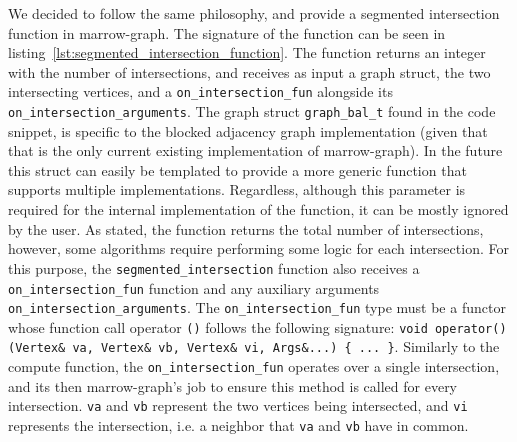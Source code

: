 We decided to follow the same philosophy, and provide a segmented intersection function in marrow-graph. The signature of the function can be seen in listing~\ref{lst:segmented_intersection_function}. The function returns an integer with the number of intersections, and receives as input a graph struct, the two intersecting vertices, and a \texttt{on\_intersection\_fun} alongside its \texttt{on\_intersection\_arguments}. The graph struct \texttt{graph\_bal\_t} found in the code snippet, is specific to the blocked adjacency graph implementation (given that that is the only current existing implementation of marrow-graph). In the future this struct can easily be templated to provide a more generic function that supports multiple implementations. Regardless, although this parameter is required for the internal implementation of the function, it can be mostly ignored by the user. As stated, the function returns the total number of intersections, however, some algorithms require performing some logic for each intersection. For this purpose, the \texttt{segmented\_intersection} function also receives a \texttt{on\_intersection\_fun} function and any auxiliary arguments \texttt{on\_intersection\_arguments}. The \texttt{on\_intersection\_fun} type must be a functor whose function call operator \texttt{()} follows the following signature: \texttt{void operator()(Vertex\& va, Vertex\& vb, Vertex\& vi, Args\&...) \{ ... \}}. Similarly to the compute function, the \texttt{on\_intersection\_fun} operates over a single intersection, and its then marrow-graph's job to ensure this method is called for every intersection. \texttt{va} and \texttt{vb} represent the two vertices being intersected, and \texttt{vi} represents the intersection, i.e. a neighbor that \texttt{va} and \texttt{vb} have in common.

